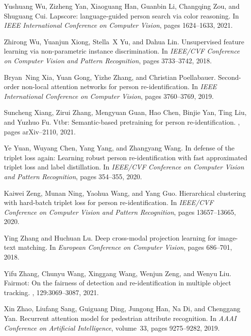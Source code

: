 \documentclass[10pt,twocolumn,letterpaper]{article}
\begin{document}
\begin{thebibliography}{10}
Yushuang Wu, Zizheng Yan, Xiaoguang Han, Guanbin Li, Changqing Zou, and
  Shuguang Cui.
\newblock Lapscore: language-guided person search via color reasoning.
\newblock In {\em IEEE International Conference on Computer Vision}, pages
  1624--1633, 2021.

Zhirong Wu, Yuanjun Xiong, Stella~X Yu, and Dahua Lin.
\newblock Unsupervised feature learning via non-parametric instance
  discrimination.
\newblock In {\em IEEE/CVF Conference on Computer Vision and Pattern
  Recognition}, pages 3733--3742, 2018.

Bryan~Ning Xia, Yuan Gong, Yizhe Zhang, and Christian Poellabauer.
\newblock Second-order non-local attention networks for person
  re-identification.
\newblock In {\em IEEE International Conference on Computer Vision}, pages
  3760--3769, 2019.

Suncheng Xiang, Zirui Zhang, Mengyuan Guan, Hao Chen, Binjie Yan, Ting Liu, and
  Yuzhuo Fu.
\newblock Vtbr: Semantic-based pretraining for person re-identification.
, pages arXiv--2110, 2021.

Ye Yuan, Wuyang Chen, Yang Yang, and Zhangyang Wang.
\newblock In defense of the triplet loss again: Learning robust person
  re-identification with fast approximated triplet loss and label distillation.
\newblock In {\em IEEE/CVF Conference on Computer Vision and Pattern
  Recognition}, pages 354--355, 2020.

Kaiwei Zeng, Munan Ning, Yaohua Wang, and Yang Guo.
\newblock Hierarchical clustering with hard-batch triplet loss for person
  re-identification.
\newblock In {\em IEEE/CVF Conference on Computer Vision and Pattern
  Recognition}, pages 13657--13665, 2020.

Ying Zhang and Huchuan Lu.
\newblock Deep cross-modal projection learning for image-text matching.
\newblock In {\em European Conference on Computer Vision}, pages 686--701,
  2018.

Yifu Zhang, Chunyu Wang, Xinggang Wang, Wenjun Zeng, and Wenyu Liu.
\newblock Fairmot: On the fairness of detection and re-identification in
  multiple object tracking.
, 129:3069--3087, 2021.

Xin Zhao, Liufang Sang, Guiguang Ding, Jungong Han, Na Di, and Chenggang Yan.
\newblock Recurrent attention model for pedestrian attribute recognition.
\newblock In {\em AAAI Conference on Artificial Intelligence}, volume~33, pages
  9275--9282, 2019.


\end{thebibliography}
\end{document}

